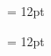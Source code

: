 \documentclass[gps1,twoside]{article}
\begin{document}
\begin{multicols}{2}
\begin{spacing}{0.458333333333333}{\raggedright}
\begin{spacing}{0.458333333333333}
\hangindent= 12pt
 \headwordafterentryletDatadicBody{}\spanenpronunciationggofonipaxemicspanentryletDatadicBody{[}\spanenpronunciationggofonipaxemicspanentryletDatadicBody{]}   \examplebeforespansensespanentryletDatadicBody{} \exampleafterspansensespanentryletDatadicBody{} \end{spacing}
 \end{spacing}\end{multicols}\begin{spacing}{0.916666666666667}\begin{center}\begin{center}

\end{center}
\end{center}\end{spacing}\setlength{\columnsep}{12pt} 
\setlength\columnseprule{0.4pt} 
\begin{multicols}{2}\begin{spacing}{0.458333333333333}{\raggedright} \begin{spacing}{0.458333333333333}
\hangindent= 12pt
 \headwordafterentryletDatadicBody{}\spanenpronunciationggofonipaxemicspanentryletDatadicBody{[}\spanenpronunciationggofonipaxemicspanentryletDatadicBody{]}  \grammaticalinfoaftersensespanentryletDatadicBody{} \end{spacing}
 \end{spacing}\end{multicols}
\end{document}
